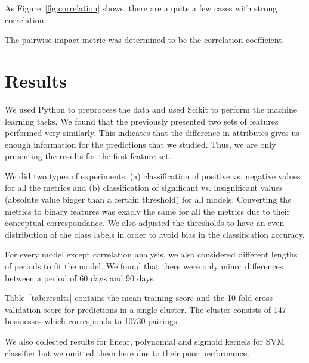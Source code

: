 \documentclass{vldb}
\begin{document}
As Figure~\ref{fig:correlation} shows, there are a quite a few cases with strong correlation.

The pairwise impact metric was determined to be the correlation coefficient. 

\section{Results}
%
We used Python to preprocess the data and used Scikit \cite{pedregosa2011scikit} to perform the machine learning tasks.
We found that the previously presented two sets of features performed very similarly.
This indicates that the difference in attributes gives us enough information for the predictions that we studied.
Thus, we are only presenting the results for the first feature set.


We did two types of experiments: (a) classification of positive vs. negative values for all the metrics and (b) classification of significant vs. insignificant values (absolute value bigger than a certain threshold) for all models. Converting the metrics to binary features was exacly the same for all the metrics due to their conceptual correspondance. We also adjusted the thresholds to have an even distribution of the class labels in order to avoid bias in the classification accuracy.

For every model except correlation analysis, we also considered different lengths of periods to fit the model.
We found that there were only minor differences between a period of 60 days and 90 days.

Table~\ref{tab:results} contains the mean training score and the 10-fold cross-validation score for predictions in a single cluster.
The cluster consists of 147 businesses which corresponds to 10730 pairings.

We also collected results for linear, polynomial and sigmoid kernels for SVM classifier but we omitted them here due to their poor performance.
\end{document}
